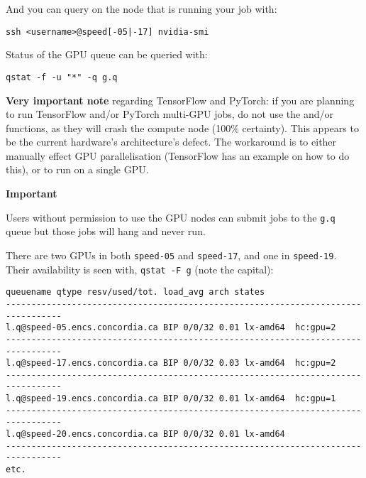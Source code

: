 \documentclass{easychair}
\begin{document}
And you can query  on the node that is running your job with:

\begin{verbatim}
ssh <username>@speed[-05|-17] nvidia-smi
\end{verbatim}

Status of the GPU queue can be queried with:

\begin{verbatim}
qstat -f -u "*" -q g.q
\end{verbatim}

\textbf{Very important note} regarding TensorFlow and PyTorch: if you are planning
to run TensorFlow and/or PyTorch multi-GPU jobs, do not use the
 and/or  functions, as they will crash
the compute node (100\% certainty). This appears to be the current hardware's architecture's defect.
%
The workaround is to either
manually effect GPU parallelisation (TensorFlow has an example on how to
do this), or to run on a single GPU.

\vspace{10pt}
\noindent
\textbf{Important}
\vspace{10pt}

Users without permission to use the GPU nodes can submit jobs to the \texttt{g.q}
queue but those jobs will hang and never run.

There are two GPUs in both \texttt{speed-05} and \texttt{speed-17}, and one 
in \texttt{speed-19}. Their availability is seen with, \texttt{qstat -F g}
(note the capital): 

\small
\begin{verbatim}
queuename qtype resv/used/tot. load_avg arch states
---------------------------------------------------------------------------------
l.q@speed-05.encs.concordia.ca BIP 0/0/32 0.01 lx-amd64  hc:gpu=2 
--------------------------------------------------------------------------------- 
l.q@speed-17.encs.concordia.ca BIP 0/0/32 0.03 lx-amd64  hc:gpu=2 
--------------------------------------------------------------------------------- 
l.q@speed-19.encs.concordia.ca BIP 0/0/32 0.01 lx-amd64  hc:gpu=1 
--------------------------------------------------------------------------------- 
l.q@speed-20.encs.concordia.ca BIP 0/0/32 0.01 lx-amd64
--------------------------------------------------------------------------------- 
etc. 
\end{verbatim}
\normalsize
\end{document}
